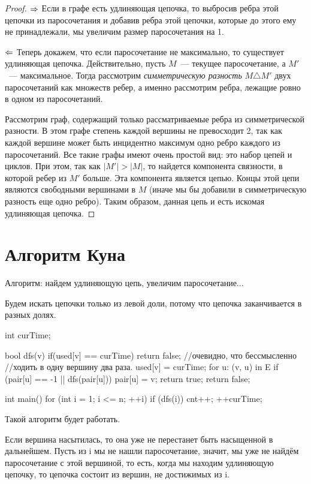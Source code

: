 \begin{proof}
$\Rightarrow$ Если в графе есть удлиняющая цепочка, то выбросив ребра этой цепочки из паросочетания и добавив
ребра этой цепочки, которые до этого ему не принадлежали, мы увеличим размер паросочетания на 1.

$\Leftarrow$ Теперь докажем, что если паросочетание не максимально, то существует удлиняющая цепочка. Действительно,
пусть $M$~--- текущее паросочетание, а $M'$~--- максимальное. Тогда рассмотрим \textit{симметрическую разность}
$M \triangle M'$ двух паросочетаний как множеств ребер, а именно рассмотрим ребра, лежащие ровно в одном из паросочетаний.

Рассмотрим граф, содержащий только рассматриваемые ребра из симметрической разности. В этом графе степень каждой вершины
не превосходит 2, так как каждой вершине может быть инцидентно максимум одно ребро каждого из паросочетаний.
Все такие графы имеют очень простой вид: это набор цепей и циклов. При этом, так как $|M'|>|M|$, то найдется компонента связности,
в которой ребер из $M'$ больше. Эта компонента является цепью. Концы этой цепи являются свободными вершинами в $M$ (иначе
мы бы добавили в симметрическую разность еще одно ребро). Таким образом, данная цепь и есть искомая удлиняющая цепочка.
\end{proof}

\section{Алгоритм Куна}
Алгоритм: найдем удлиняющую цепь, увеличим паросочетание... 

Будем искать цепочки только из левой доли, потому что цепочка заканчивается в разных долях. 

\begin{cppcode}
int curTime;

bool dfs(v) {
    if(used[v] == curTime) return false; //очевидно, что бессмысленно
    //ходить в одну вершину два раза.
    used[v] = curTime; 
    for u: (v, u) in E {
        if (pair[u] == -1 || dfs(pair[u])) {
            pair[u] = v;
            return true;
        }
    }
    return false;
}

int main() {
    for (int i = 1; i <= n; ++i) {
        if (dfs(i)) {
            cnt++;
            ++curTime;
        }
    }
}
\end{cppcode}
   
Такой алгоритм будет работать.

Если вершина насытилась, то она уже не перестанет быть насыщенной в дальнейшем. 
Пусть из i мы не нашли паросочетание, значит, мы уже не найдём паросочетание с этой вершиной, то есть, 
когда мы находим удлиняющую цепочку, то цепочка состоит из вершин, не достижимых из i.

